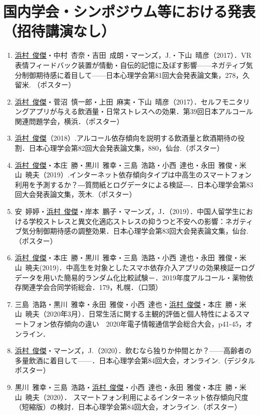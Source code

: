 \documentclass[11pt,a4paper]{article}
\begin{document}
\section{国内学会・シンポジウム等における発表（招待講演なし）}
\begin{enumerate}
	\item \underline{浜村\ 俊傑}・中村\ 杏奈・吉田\ 成朗・マーンズ，J.・下山\ 晴彦（2017）．VR表情フィードバック装置が情動・自伝的記憶に及ぼす影響——ネガティブ気分制御期待感に着目して——日本心理学会第81回大会発表論文集，278，久留米. （ポスター）
	\item \underline{浜村\ 俊傑}・菅沼\ 慎一郎・上田\ 麻実・下山\ 晴彦（2017）．セルフモニタリングアプリが与える飲酒量・日常ストレスへの効果．第39回日本アルコール関連問題学会，横浜．（ポスター）
	\item \underline{浜村\ 俊傑}（2018）.アルコール依存傾向を説明する飲酒量と飲酒期待の役割．日本心理学会第82回大会発表論文集，880，仙台.（ポスター）
	\item \underline{浜村\ 俊傑}・本庄\ 勝・黒川\ 雅幸・三島\ 浩路・小西\ 達也・永田\ 雅俊・米山\ 暁夫（2019）.インターネット依存傾向タイプは中高生のスマートフォン利用を予測するか？―質問紙とログデータによる検証―．日本心理学会第83回大会発表論文集，茨木.（ポスター）
	\item 安\ 婷婷・\underline{浜村\ 俊傑}・岸本\ 鵬子・マーンズ，J．（2019）．中国人留学生における学校ストレスと異文化適応ストレスの抑うつと不安への影響：ネガティブ気分制御期待感の調整効果．日本心理学会第83回大会発表論文集，仙台.（ポスター）
	\item\underline{浜村\ 俊傑}・本庄\ 勝・黒川\ 雅幸・三島\ 浩路・小西\ 達也・永田\ 雅俊・米山\ 暁夫(2019)．中高生を対象としたスマホ依存介入アプリの効果検証ーログデータを用いた簡易的ランダム化比較試験－．2019年度アルコール・薬物依存関連学会合同学術総会．179，札幌．（口頭）
	\item 三島\ 浩路・黒川\ 雅幸・永田\ 雅俊・小西\ 達也・\underline{浜村\ 俊傑}・本庄\ 勝・米山\ 暁夫（2020年3月）．日常生活に関する主観的評価と個人特性によるスマートフォン依存傾向の違い　2020年電子情報通信学会総合大会，p41-45，オンライン．　
	\item \underline{浜村\ 俊傑}・マーンズ，J.（2020）．飲むなら独りか仲間とか？——高齢者の多量飲酒に着目して——．日本心理学会第84回大会，オンライン.（デジタルポスター）
	\item 黒川\ 雅幸・三島\ 浩路・\underline{浜村\ 俊傑}・小西\ 達也・永田\ 雅俊・本庄\ 勝・米山\ 暁夫（2020）．	スマートフォン利用によるインターネット依存傾向尺度（短縮版）の検討．日本心理学会第84回大会，オンライン.（ポスター）

\end{enumerate}
\end{document}
